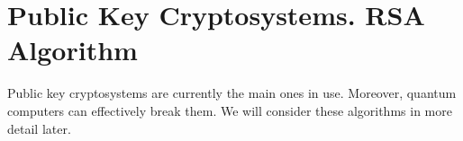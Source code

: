 \chapter{Public Key Cryptosystems. RSA Algorithm}
Public key cryptosystems are currently the main ones in use. Moreover, quantum
computers can effectively break them. We will consider these algorithms in more detail later.







